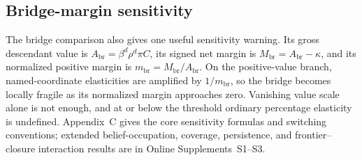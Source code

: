 \subsection{Bridge-margin sensitivity}

The bridge comparison also gives one useful sensitivity warning.  Its gross
descendant value is \(A_{\mathrm{br}}=\beta^d\rho^d\pi C\), its signed net
margin is \(M_{\mathrm{br}}=A_{\mathrm{br}}-\kappa\), and its normalized
positive margin is \(m_{\mathrm{br}}=M_{\mathrm{br}}/A_{\mathrm{br}}\).
On the positive-value branch, named-coordinate elasticities are amplified by
\(1/m_{\mathrm{br}}\), so the bridge becomes locally fragile as its normalized
margin approaches zero.  Vanishing value scale alone is not enough, and at or
below the threshold ordinary percentage elasticity is undefined.  Appendix~C
gives the core sensitivity formulas and switching conventions; extended
belief-occupation, coverage, persistence, and frontier--closure interaction
results are in Online Supplements~S1--S3.
